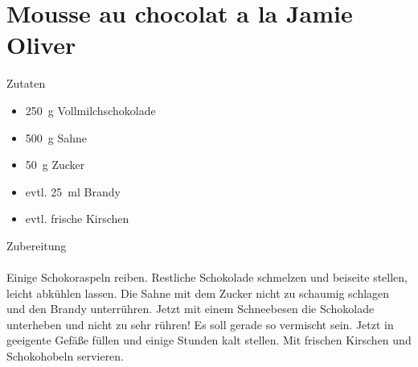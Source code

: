 \section*{Mousse au chocolat a la Jamie Oliver}
\ihead{}\ohead{}
\cfoot{}
{\Large Zutaten}
\begin{multicols}{2}
\begin{itemize}
    \item \SI{250}{g} Vollmilchschokolade
    \item \SI{500}{g} Sahne
    \item \SI{50}{g} Zucker
    \item evtl. \SI{25}{ml} Brandy
    \item evtl. frische Kirschen
\end{itemize}
\columnbreak
\end{multicols}
\noindent
{\Large Zubereitung}\\
\\
Einige Schokoraspeln reiben. 
Restliche Schokolade schmelzen und beiseite stellen, leicht abkühlen lassen.
Die Sahne mit dem Zucker nicht zu schaumig schlagen und den Brandy unterrühren. 
Jetzt mit einem Schneebesen die Schokolade unterheben und nicht zu sehr rühren!
Es soll gerade so vermischt sein.
Jetzt in geeigente Gefäße füllen und einige Stunden kalt stellen.
Mit frischen Kirschen und Schokohobeln servieren.
